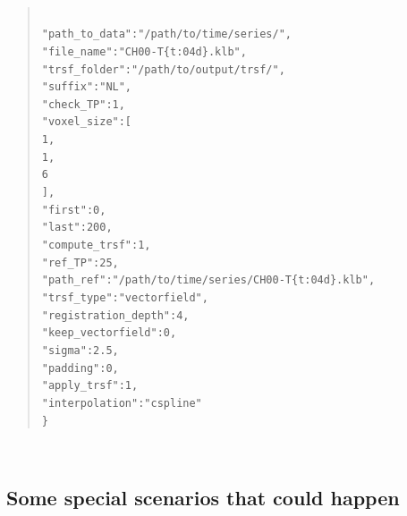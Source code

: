\documentclass[10pt,a4paper]{article}
\newcommand\tab[1][.6cm]{\hspace*{#1}}
\newenvironment{code}[1]{\mbox{}\\[1ex]\hspace*{-#1cm}\begin{minipage}{150mm}\begin{quote}\tt}{\end{quote}\end{minipage}\mbox{}\\[1ex]}
\begin{document}
\begin{code}{0.8}
\{\\
\tab"path\_to\_data":"/path/to/time/series/",\\
\tab"file\_name":"CH00-T\{t:04d\}.klb",\\
\tab"trsf\_folder":"/path/to/output/trsf/",\\
\tab"suffix":"NL",\\
\tab"check\_TP":1,\\
\tab"voxel\_size":[\\
\tab\tab1,\\
\tab\tab1,\\
\tab\tab6\\
\tab],\\
\tab"first":0,\\
\tab"last":200,\\
\tab"compute\_trsf":1,\\
\tab"ref\_TP":25,\\
\tab"path\_ref":"/path/to/time/series/CH00-T\{t:04d\}.klb",\\
\tab"trsf\_type":"vectorfield",\\
\tab"registration\_depth":4,\\
\tab"keep\_vectorfield":0,\\
\tab"sigma":2.5,\\
\tab"padding":0,\\
\tab"apply\_trsf":1,\\
\tab"interpolation":"cspline"\\
\}
\end{code}
\subsection{Some special scenarios that could happen}
\end{document}
